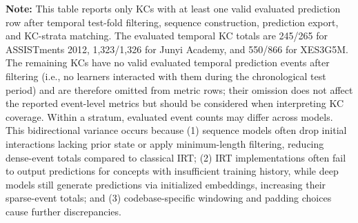 \begin{table}[htbp]
{\begin{tabular}{lllcrccccc}
\end{tabular}%
}

\vspace{1ex}
{\scriptsize \textbf{Note:} This table reports only KCs with at least one valid evaluated prediction row after temporal test-fold filtering, sequence construction, prediction export, and KC-strata matching. The evaluated temporal KC totals are 245/265 for ASSISTments 2012, 1,323/1,326 for Junyi Academy, and 550/866 for XES3G5M. The remaining KCs have no valid evaluated temporal prediction events after filtering (i.e., no learners interacted with them during the chronological test period) and are therefore omitted from metric rows; their omission does not affect the reported event-level metrics but should be considered when interpreting KC coverage. Within a stratum, evaluated event counts may differ across models. This bidirectional variance occurs because (1) sequence models often drop initial interactions lacking prior state or apply minimum-length filtering, reducing dense-event totals compared to classical IRT; (2) IRT implementations often fail to output predictions for concepts with insufficient training history, while deep models still generate predictions via initialized embeddings, increasing their sparse-event totals; and (3) codebase-specific windowing and padding choices cause further discrepancies.\par}

\end{table}
